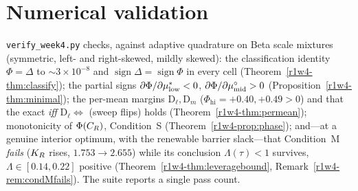 \section{Numerical validation}\label{r1w4-sec:num}

\texttt{verify\_week4.py} checks, against adaptive quadrature on Beta scale mixtures
(symmetric, left- and right-skewed, mildly skewed): the classification identity
$\Phi=\Delta$ to $\sim3\times10^{-8}$ and $\operatorname{sign}\Delta=\operatorname{sign}\Phi$ in
every cell (Theorem~\ref{r1w4-thm:classify}); the partial signs
$\partial\Phi/\partial\mu^{*}_{\mathrm{low}}<0$, $\partial\Phi/\partial\mu^{\circ}_{\mathrm{mid}}>0$
(Proposition~\ref{r1w4-thm:minimal}); the per-mean margins $\mathrm{D}_\ell,\mathrm{D}_m$
($\Phi_{\mathrm{hi}}=+0.40,+0.49>0$) and that the exact \emph{iff}
$\mathrm{D}_\ell\Leftrightarrow$ (sweep flips) holds (Theorem~\ref{r1w4-thm:permean});
monotonicity of $\Phi(C_R)$, Condition~S (Theorem~\ref{r1w4-prop:phase}); and---at a genuine
interior optimum, with the renewable barrier slack---that Condition~M \emph{fails} ($K_R$
rises, $1.753\to2.655$) while its conclusion $\Lambda(\tau)<1$ survives, $\Lambda\in[0.14,0.22]$
positive (Theorem~\ref{r1w4-thm:leveragebound}, Remark~\ref{r1w4-rem:condMfails}). The suite
reports a single pass count.
